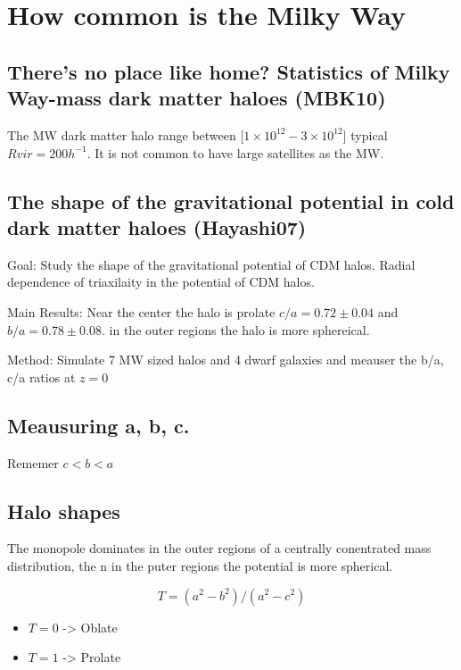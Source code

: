 \documentclass[12pt]{article}
\begin{document}
\section{How common is the Milky Way}

\subsection{There’s no place like home? Statistics of Milky Way-mass dark matter
haloes (MBK10)}

The MW dark matter halo range between [$1\times 10^{12} - 3\times 10^{12}$]
typical $Rvir = 200 h^{-1}$. It is not common to have large satellites as
the MW. 

\subsection{The shape of the gravitational potential in cold dark matter haloes (Hayashi07)}

Goal: Study the shape of the gravitational potential of CDM halos. Radial dependence of triaxilaity in the potential of CDM halos.
 
Main Results: Near the center the halo is prolate $c/a = 0.72 \pm 0.04$
and $b/a = 0.78 \pm 0.08$. in the outer regions the halo is more sphereical.

Method: Simulate 7 MW sized halos and 4 dwarf galaxies and meauser the b/a, c/a ratios at $z=0$
\subsection{Meausuring a, b, c.}

Rememer $c<b<a$

\subsection{Halo shapes}

The monopole dominates in the outer regions of a centrally conentrated mass distribution, the n in the puter
regions the potential is more spherical. 

\begin{equation}
T = (a^2 - b^2)/(a^2-c^2)
\end{equation}

\begin{itemize}
\item $T=0$ -> Oblate
\item $T=1$ -> Prolate 
\end{itemize}
\end{document}
